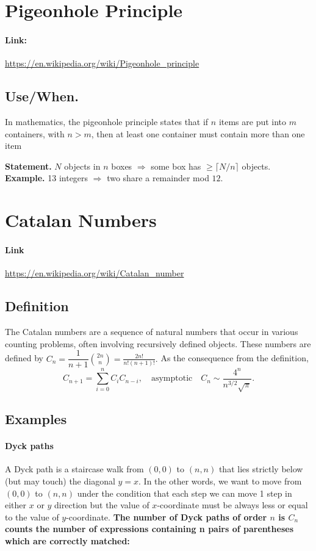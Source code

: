 \documentclass[11pt,A4,twoside]{article}
\let\oldsection\section
\renewcommand{\section}{\FloatBarrier\oldsection}
\let\oldsubsection\subsection
\renewcommand{\subsection}{\FloatBarrier\oldsubsection}
\numberwithin{equation}{section}
\theoremstyle{definition}
\theoremstyle{remark}
\newcommand\qq{\quad}
\newcommand{\Binom}[2]{\binom{#1}{#2}}
\begin{document}
\section{Pigeonhole Principle}
\paragraph{Link:} \url{https://en.wikipedia.org/wiki/Pigeonhole_principle}

\subsection{Use/When.} In mathematics, the pigeonhole principle states that if $n$ items are put into $m$ containers, with $n > m$, then at least one container must contain more than one item


\textbf{Statement.} \(N\) objects in \(n\) boxes \(\Rightarrow\) some box has \(\ge \lceil N/n\rceil\) objects.\\
\textbf{Example.} 13 integers \(\Rightarrow\) two share a remainder mod \(12\).

\section{Catalan Numbers}
\paragraph{Link} \url{https://en.wikipedia.org/wiki/Catalan_number}

\subsection{Definition} The Catalan numbers are a sequence of natural numbers that occur in various counting problems, often involving recursively defined objects. These numbers are defined by
$C_n=\dfrac{1}{n+1}\Binom{2n}{n} = \frac{2n!}{n!(n+1)!}.$
As the consequence from the definition, 
$$C_{n+1}=\sum_{i=0}^n C_iC_{n-i}, \qq \mbox{asymptotic} \qq C_n\sim \dfrac{4^n}{n^{3/2}\sqrt{\pi}}.$$

\subsection{Examples} 
\paragraph{Dyck paths} A Dyck path is a staircase walk from $(0,0)$ to $(n,n)$ that lies strictly below (but may touch) the diagonal $y=x$. In the other words, we want to move from $(0,0)$ to $(n,n)$ under the condition that each step we can move 1 step in either $x$ or $y$ direction but the value of $x$-coordinate must be always less or equal to  the value of $y$-coordinate. \textbf{The number of Dyck paths of order $n$ is $C_n$ counts the number of expressions containing n pairs of parentheses which are correctly matched:}
\end{document}
